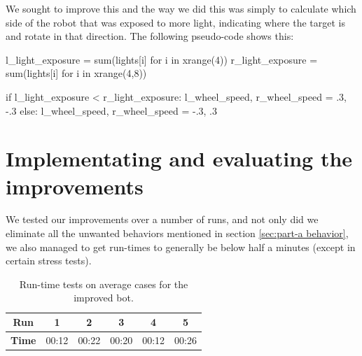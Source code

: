 \documentclass[a4paper,10pt]{article}
\begin{document}
We sought to improve this and the way we did this was simply to calculate 
which side of the robot that was exposed to more light, indicating where the 
target is and rotate in that direction. The following pseudo-code shows this:

\begin{python}
l_light_exposure = sum(lights[i] for i in xrange(4))
r_light_exposure = sum(lights[i] for i in xrange(4,8))

if l_light_exposure < r_light_exposure:
    l_wheel_speed, r_wheel_speed = .3, -.3
else:
    l_wheel_speed, r_wheel_speed = -.3, .3
\end{python}

\section{Implementating and evaluating the improvements}

We tested our improvements over a number of runs, and not only did we eliminate
all the unwanted behaviors  mentioned in section \ref{sec:part-a behavior}, we also managed 
to get run-times to generally be below half a minutes (except in certain stress tests).

\begin{table}
    \centering
    \begin{tabular}{c|c|c|c|c|c}
        \textbf{Run}    & \textbf{1} & \textbf{2} & \textbf{3} &
        \textbf{4}      & \textbf{5}     \\ \hline
        \textbf{Time}   & 00:12 & 00:22 & 00:20 & 00:12 & 00:26 \\
    \end{tabular}
    \caption{Run-time tests on average cases for the improved bot.}
\end{table}
\end{document}

